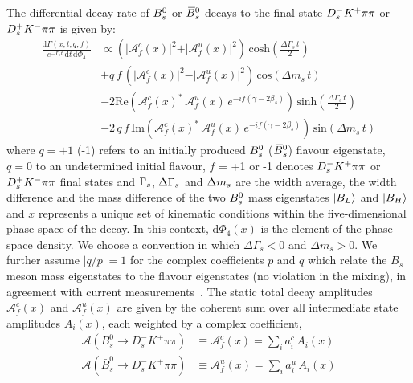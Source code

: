 The differential decay rate of ${{B}^0_{s}}$ or ${{\kern 0.18em\overline{\kern -0.18em B}{}}{}^0_{s}}$ decays to the final state $D_s^{-} {{K}^+} \pi\pi$ or $D_s^{+} {{K}^-} \pi\pi$
is given by:
\begin{equation}
\begin{split}
\label{eq:PDF_full}
        \frac{ \text{d}\Gamma(x,t,q,f)}{ e^{- \Gamma_s t} \, \text{d}t \, \text{d}\Phi_4} &\propto  
         \left( \vert \mathcal A^c_{f}(x) \vert^2 + \vert \mathcal A^u_{f}(x) \vert^2 \right) \, \text{cosh} \left( \frac{\Delta \Gamma_s \, t}{2}\right) \\
         & + q \, f \,  \left( \vert \mathcal A^c_{f}(x) \vert^2 - \vert \mathcal A^u_{f}(x)  \vert^2 \right) \, \text{cos} \left(\Delta m_s \, t \right)  \\
         & -2 \text{Re}\left( \mathcal A^c_{f}(x)^{*}  \, \mathcal A^u_{f}(x)  \, e^{-i f (\gamma - 2\beta_s)}  \right) \, \text{sinh} \left( \frac{\Delta \Gamma_s \, t}{2}\right)  \\
         & -2 \, q \, f \, \text{Im}\left( \mathcal A^c_{f}(x)^{*} \, \mathcal A^u_{f}(x)  \, e^{-i f (\gamma - 2\beta_s)}  \right)\, \text{sin} \left(\Delta m_s \, t \right)  
\end{split}
\end{equation}
where $q = +1$ (-1) refers to an initially produced ${{B}^0_{s}}$ (${{\kern 0.18em\overline{\kern -0.18em B}{}}{}^0_{s}}$) flavour eigenstate, $q = 0$ to an undetermined initial flavour,
$f$ = +1  or -1 denotes $D_s^{-} {{K}^+} \pi\pi$ or $D_s^{+} {{K}^-} \pi\pi$ final states and ${\Gamma_{{s}}}$, ${\Delta\Gamma_{{s}}}$ and ${\Delta m_{{s}}}$ are the width average, 
the width difference and the mass difference of the two ${{B}^0_{s}}$ mass eigenstates $|B_{L}\rangle$ and $|B_{H}\rangle$ and $x$
represents a unique set of kinematic conditions within the five-dimensional phase space of the decay.
In this context, $\text{d}\Phi_{4}(x)$ is the element of the phase space density.
We choose a convention in which $\Delta\Gamma_s < 0$ and $\Delta m_s > 0$.
We further assume $\vert q/p \vert = 1$ for the complex coefficients $p$ and $q$ which relate the $B_s$ meson mass eigenstates to the flavour eigenstates (no \CP violation in the mixing), 
in agreement with current measurements~\cite{LHCb-PAPER-2016-013}.\newline
The static total decay amplitudes  $\mathcal A^c_{f}(x)$  and $ \mathcal A^u_{f}(x)$ are given by 
the coherent sum over all intermediate state amplitudes $A_i(x)$, each weighted by a complex coefficient,
 \begin{align}
 \mathcal A(B_s^0 \to D_s^{-} K^{+} \pi\pi) &\equiv \mathcal{A}^c_f(x) = \sum_i a^c_i \, A_i(x)   \\
 \mathcal A(\bar B_s^0 \to D_s^{-} K^{+} \pi\pi) &\equiv \mathcal A^u_f(x)  =  \sum_i  a^u_i \, A_i(x)   
 \end{align}
